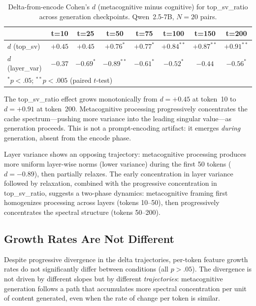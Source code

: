 \documentclass[11pt,a4paper]{article}
\begin{document}
\begin{table}[H]
\centering
\caption{Delta-from-encode Cohen's $d$ (metacognitive minus cognitive) for top\_sv\_ratio across generation checkpoints. Qwen~2.5-7B, $N = 20$ pairs.}
\label{tab:exp_d_trajectory}
\begin{tabular}{lccccccc}
\toprule
 & \textbf{t=10} & \textbf{t=25} & \textbf{t=50} & \textbf{t=75} & \textbf{t=100} & \textbf{t=150} & \textbf{t=200} \\
\midrule
$d$ (top\_sv)  & $+0.45$ & $+0.45$ & $+0.76^{*}$ & $+0.77^{*}$ & $+0.84^{**}$ & $+0.87^{**}$ & $+0.91^{**}$ \\
$d$ (layer\_var)  & $-0.37$ & $-0.69^{*}$ & $-0.89^{**}$ & $-0.61^{*}$ & $-0.52^{*}$ & $-0.44$ & $-0.56^{*}$ \\
\bottomrule
\multicolumn{8}{l}{\footnotesize $^{*}p < .05$; $^{**}p < .005$ (paired $t$-test)}
\end{tabular}
\end{table}

The top\_sv\_ratio effect grows monotonically from $d = +0.45$ at token~10 to $d = +0.91$ at token~200. Metacognitive processing progressively concentrates the cache spectrum---pushing more variance into the leading singular value---as generation proceeds. This is not a prompt-encoding artifact: it emerges \emph{during} generation, absent from the encode phase.

Layer variance shows an opposing trajectory: metacognitive processing produces more uniform layer-wise norms (lower variance) during the first 50 tokens ($d = -0.89$), then partially relaxes. The early concentration in layer variance followed by relaxation, combined with the progressive concentration in top\_sv\_ratio, suggests a two-phase dynamics: metacognitive framing first homogenizes processing across layers (tokens 10--50), then progressively concentrates the spectral structure (tokens 50--200).

\subsection{Growth Rates Are Not Different}

Despite progressive divergence in the delta trajectories, per-token feature growth rates do not significantly differ between conditions (all $p > .05$). The divergence is not driven by different slopes but by different \emph{trajectories}: metacognitive generation follows a path that accumulates more spectral concentration per unit of content generated, even when the rate of change per token is similar.
\end{document}
